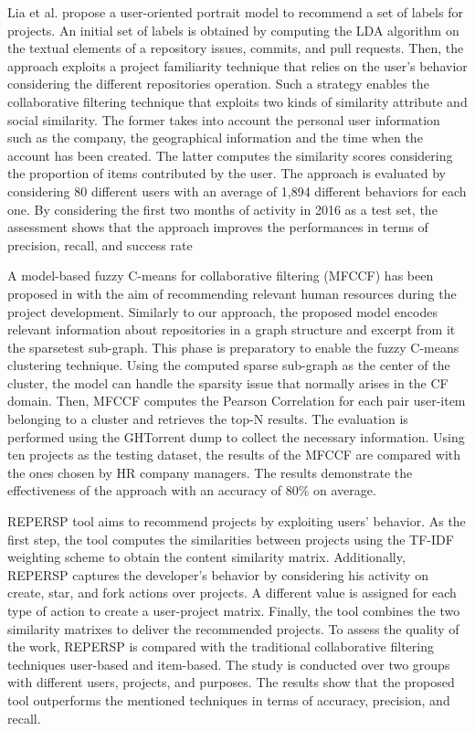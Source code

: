 Lia et al. \cite{liao_user_2018} propose a user-oriented portrait model to recommend a set of labels for \GH projects. An initial set of labels is obtained by computing the LDA algorithm on the textual elements of a repository \ie issues, commits, and pull requests. Then, the approach exploits a project familiarity technique that relies on the user's behavior considering the different repositories operation. Such a strategy enables the collaborative filtering technique that exploits two kinds of similarity \ie attribute and social similarity. The former takes into account the personal user information such as the company, the geographical information and the time when the account has been created. The latter computes the similarity scores considering the proportion of items contributed by the user. The approach is evaluated by considering 80 different users with an average of 1,894 different behaviors for each one. By considering the first two months of activity in 2016 as a test set, the assessment shows that the approach improves the performances in terms of precision, recall, and success rate


A model-based fuzzy C-means for collaborative filtering (MFCCF) has been proposed in \cite{ajoudanian_recommending_2019} with the aim of recommending relevant human resources during the \GH project development. Similarly to our approach, the proposed model encodes relevant information about repositories in a graph structure and excerpt from it the sparsetest sub-graph. This phase is preparatory to enable the fuzzy C-means clustering technique. Using the computed sparse sub-graph as the center of the cluster, the model can handle the sparsity issue that normally arises in the CF domain. Then, MFCCF computes the Pearson Correlation for each pair user-item belonging to a cluster and retrieves the top-N results. The evaluation is performed using the GHTorrent dump to collect the necessary information. Using ten projects as the testing dataset, the results of the MFCCF are compared with the ones chosen by HR company managers. The results demonstrate the effectiveness of the approach with an accuracy of 80\% on average. 

REPERSP tool \cite{xu_repersp_2017} aims to recommend \GH projects by exploiting users' behavior. As the first step, the tool computes the similarities between projects using the TF-IDF weighting scheme to obtain the content similarity matrix. Additionally, REPERSP captures the developer's behavior by considering his activity on \GH \ie create, star, and fork actions over projects. A different value is assigned for each type of action to create a user-project matrix. Finally, the tool combines the two similarity matrixes to deliver the recommended projects. To assess the quality of the work, REPERSP is compared with the traditional collaborative filtering techniques \ie user-based and item-based. The study is conducted over two groups with different users, projects, and purposes. The results show that the proposed tool outperforms the mentioned techniques in terms of accuracy, precision, and recall. 